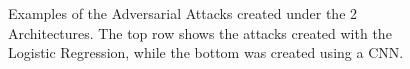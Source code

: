 \documentclass{asaproc}
\begin{document}
\begin{figure}[h!]
	\centering
	\caption{\enspace Examples of the Adversarial Attacks created under the 2 Architectures. The top row shows the attacks created with the Logistic Regression, while the bottom was created using a CNN.}
	   \\
	   \\
	\label{fig1}
\end{figure}
\end{document}

